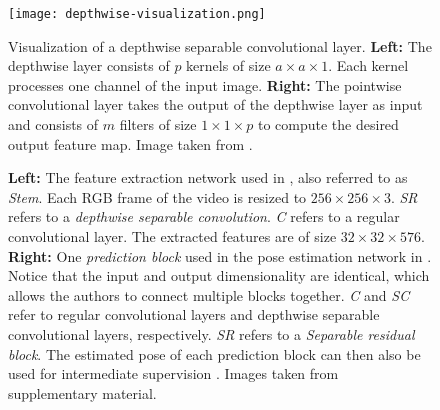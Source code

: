 \begin{figure}[htb!]
    \centering
    \texttt{[image: depthwise-visualization.png]}
    \caption{Visualization of a depthwise separable convolutional layer. \textbf{Left:} The depthwise layer consists of $p$ kernels of size $a \times a \times 1$. Each kernel processes one channel of the input image. \textbf{Right:} The pointwise convolutional layer takes the output of the depthwise layer as input and consists of $m$ filters of size $1 \times 1 \times p$ to compute the desired output feature map. Image taken from \cite{wang_basic_2018}.}
    \label{fig:depthwise-separable-illustration}
\end{figure}


\begin{figure}[htb!]
    \centering
    \hfill
    \caption{\textbf{Left:} The feature extraction network used in \cite{luvizon_2d/3d_2018}, also referred to as \textit{Stem}. Each RGB frame of the video is resized to $256 \times 256 \times 3$. \textit{SR} refers to a \textit{depthwise separable convolution}. \textit{C} refers to a regular convolutional layer. The extracted features are of size $32 \times 32 \times 576$.
    \textbf{Right:} One \textit{prediction block} used in the pose estimation network in \cite{luvizon_2d/3d_2018}. Notice that the input and output dimensionality are identical, which allows the authors to connect multiple blocks together. \textit{C} and \textit{SC} refer to regular convolutional layers and depthwise separable convolutional layers, respectively. \textit{SR} refers to a \textit{Separable residual block}. The estimated pose of each prediction block can then also be used for intermediate supervision . Images taken from \cite{luvizon_2d/3d_2018} supplementary material.}
\end{figure}

